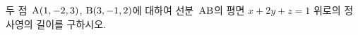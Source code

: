 두 점~$\mathrm{A}(1{,}\mkern3mu\mathopen{}-2{,}\mkern3mu\mathopen{}3)$, $\mathrm{B}(3{,}\mkern3mu\mathopen{}-1{,}\mkern3mu\mathopen{}2)$에 대하여 선분~$\mathrm{AB}$의 평면 $x+2y+z=1$ 위로의 정사영의 길이를 구하시오.
